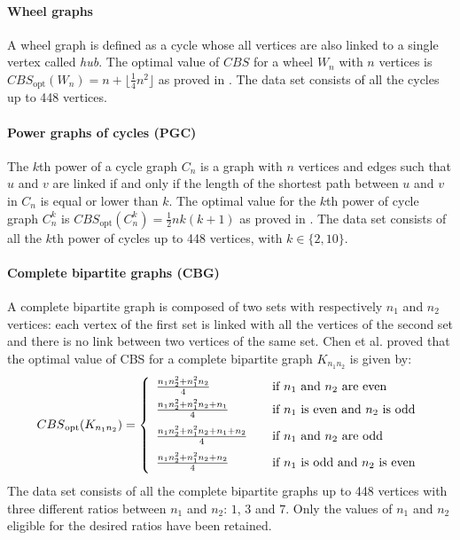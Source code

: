 \documentclass{scrartcl}
\theoremstyle{plain}
\newcommand{\cbs}{CBS}
\begin{document}
\paragraph{\textbf{Wheel graphs}}
A wheel graph is defined as a cycle whose all vertices are also linked to a 
single 
vertex called \emph{hub}. The optimal value of $\cbs{}$ for a wheel $W_n$ with 
$n$ vertices is  $\cbs{}_{\text{opt}}(W_n) = n + \lfloor \frac{1}{4} n^2 
\rfloor$ as proved in \cite{Jianxiu2001}. The data set consists of all the 
cycles up to 448 vertices.

\paragraph{\textbf{Power graphs of cycles (PGC)}}
The $k$th power of a cycle graph $C_n$ is a graph with $n$ vertices and edges 
such that $u$ and $v$ are linked if and only if the length of the shortest path 
between $u$ and $v$ in $C_n$ is equal or lower than $k$. The optimal value for 
the $k$th power of cycle graph $C_n^k$ is $\cbs{}_{\text{opt}}(C_n^k) = 
\frac{1}{2} nk(k+1)$ as proved in \cite{Jianxiu2001}. The data set consists of 
all the $k$th power of cycles up to 448 vertices, with $k \in \{2, 10\}$.

\paragraph{\textbf{Complete bipartite graphs (CBG)}}
A complete bipartite graph is  composed of two sets with respectively $n_1$ and 
$n_2$ vertices: each vertex of the first set is linked with all the vertices of 
the second set and there is no link between two vertices of 
the same set. Chen et al. \cite{Chen2007} proved that the optimal value of 
\cbs{} for a complete bipartite graph $K_{n_1n_2}$ is given by:
\begin{align}
\cbs{}_{\text{opt}}(K_{n_1n_2}) = 
	  			\left\{
	  			\begin{array}{l l}
	    				\frac{n_1n_2^2 + n_1^2n_2}{4} & \quad \text{if $n_1$ 
and $n_2$ are even}\\
	    				\rule[-1.5ex]{0pt}{5ex}
	    				\frac{n_1n_2^2 + n_1^2n_2 + n_1}{4} & \quad \text{if 
$n_1$ is even and $n_2$ is odd}\\    
	    				\rule[-1.5ex]{0pt}{5ex}
	    				\frac{n_1n_2^2 + n_1^2n_2 + n_1 + n_2}{4} & \quad 
\text{if $n_1$ and $n_2$ are odd}\\
	    				\rule[-1.5ex]{0pt}{5ex}
  	   				\frac{n_1n_2^2 + n_1^2n_2 + n_2}{4} & \quad \text{if $n_1$ 
is odd and $n_2$ is even}\\
	  			\end{array} \right. \nonumber
\end{align}
The data set consists of all the complete bipartite graphs up to 448 vertices 
with three different ratios between $n_1$ and $n_2$: $1$, $3$ and $7$. Only the 
values of $n_1$ and $n_2$ eligible for the desired ratios have been retained.
\end{document}
